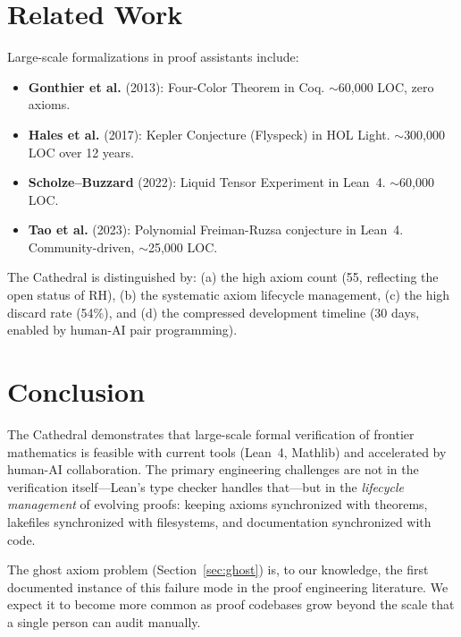 \documentclass[11pt,a4paper]{article}
\begin{document}
\section{Related Work}

Large-scale formalizations in proof assistants include:

\begin{itemize}
  \item \textbf{Gonthier et al.} (2013): Four-Color Theorem in Coq.
    $\sim$60,000 LOC, zero axioms.
  \item \textbf{Hales et al.} (2017): Kepler Conjecture (Flyspeck)
    in HOL Light. $\sim$300,000 LOC over 12 years.
  \item \textbf{Scholze--Buzzard} (2022): Liquid Tensor Experiment
    in Lean~4. $\sim$60,000 LOC.
  \item \textbf{Tao et al.} (2023): Polynomial Freiman-Ruzsa
    conjecture in Lean~4. Community-driven, $\sim$25,000 LOC.
\end{itemize}

The Cathedral is distinguished by: (a) the high axiom count (55,
reflecting the open status of RH), (b) the systematic axiom
lifecycle management, (c) the high discard rate (54\%), and
(d) the compressed development timeline (30 days, enabled by
human-AI pair programming).

\section{Conclusion}

The Cathedral demonstrates that large-scale formal verification of
frontier mathematics is feasible with current tools (Lean~4, Mathlib)
and accelerated by human-AI collaboration. The primary engineering
challenges are not in the verification itself---Lean's type checker
handles that---but in the \emph{lifecycle management} of evolving
proofs: keeping axioms synchronized with theorems, lakefiles
synchronized with filesystems, and documentation synchronized with
code.

The ghost axiom problem (Section~\ref{sec:ghost}) is, to our
knowledge, the first documented instance of this failure mode in the
proof engineering literature. We expect it to become more common as
proof codebases grow beyond the scale that a single person can audit
manually.
\end{document}
